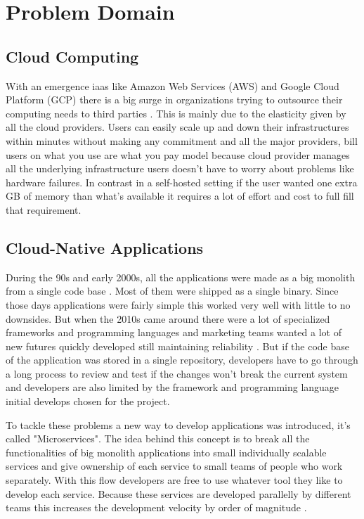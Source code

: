 \section{Problem Domain}

\subsection{Cloud Computing}
With an emergence \ac{iaas} like Amazon Web Services (AWS) and Google Cloud Platform (GCP) there is a big surge in organizations trying to outsource their computing needs to third parties \citep{rimol_2021}. This is mainly due to the elasticity given by all the cloud providers. Users can easily scale up and down their infrastructures within minutes without making any commitment and all the major providers, bill users on what you use are what you pay model because cloud provider manages all the underlying infrastructure users doesn't have to worry about problems like hardware failures. In contrast in a self-hosted setting if the user wanted one extra GB of memory than what's available it requires a lot of effort and cost to full fill that requirement.

\subsection{Cloud-Native Applications}
During the 90s and early 2000s, all the applications were made as a big monolith from a single code base \citep{LessonsF52:online}. Most of them were shipped as a single binary. Since those days applications were fairly simple this worked very well with little to no downsides. But when the 2010s came around there were a lot of specialized frameworks and programming languages and marketing teams wanted a lot of new futures quickly developed still maintaining reliability \citep{di2018migrating,Microser52:online}. But if the code base of the application was stored in a single repository, developers have to go through a long process to review and test if the changes won't break the current system and developers are also limited by the framework and programming language initial develops chosen for the project.

To tackle these problems a new way to develop applications was introduced, it's called "Microservices". The idea behind this concept is to break all the functionalities of big monolith applications into small individually scalable services and give ownership of each service to small teams of people who work separately. With this flow developers are free to use whatever tool they like to develop each service. Because these services are developed parallelly by different teams this increases the development velocity by order of magnitude \citep{Understa56:online}.

